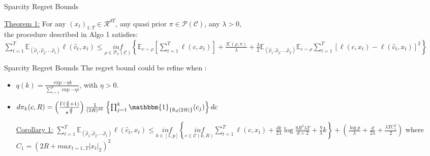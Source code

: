 \documentclass[10pt]{beamer}
\begin{document}
\begin{frame}{Sparcity Regret Bounds}
\begin{block}{\underline{Theorem 1:}}
For any $(x_{t})_{1:T} \in \mathscr{R}^{dT}$,
any quasi prior $\pi \in \mathscr{P}(\mathscr{C})$, any $\lambda >0$,\\
\smallbreak 
the procedure described in Algo 1 satisfies:\\
\smallbreak
$
\sum_{t=1}^{T} \mathds{E}_{(\hat{\rho}_{1},\hat{\rho}_{2},...\hat{\rho}_{t})}
\ell(\hat{c}_{t}, x_{t}) \leq  \underset{\rho \in \mathscr{P}_{\pi}(\mathscr{C})}{inf}  \left\{ \mathds{E}_{c \sim \rho} [ \sum_{t=1}^{T} \ell (c, x_{t}) ] +
\frac{\mathcal{K}(\rho, \pi)}{\lambda} + 
\frac{\lambda}{2} \mathds{E}_{(\hat{\rho}_{1},\hat{\rho}_{2},...\hat{\rho}_{T})} \mathds{E}_{c \sim \rho} \sum_{t=1}^{T} [\ell (c, x_{t}) - \ell (\hat{c}_{t}, x_{t})]^{2} \right\}
$
\end{block}
\end{frame}

\begin{frame}[fragile]{Sparcity Regret Bounds}
The regret bound could be refine when :\\
\begin{itemize}
\item $q(k) = \frac{\exp{-\eta k}}{\sum_{i=1}^{p}\exp{-\eta i}}$, with $\eta >0$.\\
\item $d\pi_{k}(c, R) = \left(\frac{\Gamma (\frac{d}{2}+1)}{\pi^{\frac{d}{2}}} \right) \frac{1}{(2R)^{dk}} \left\{ \prod_{j=1}^{k} \mathbbm{1}_{\{ \mathbb{B}_{d}(2R) \} }(c_{j}) \right\} dc$
\smallbreak
\begin{block}{\underline{Corollary 1:}}
$\sum_{t=1}^{T} \mathds{E}_{(\hat{\rho}_{1},\hat{\rho}_{2},...\hat{\rho}_{t})}             \ell (\hat{c}_{t}, x_{t}) \leq                                     \underset{k \in [1,p]}{inf} \left\{                                       \underset{c \in \mathscr{C}(k,R)}{inf} \sum_{t=1}^{T}  \ell (c, x_{t})   +\frac{dk}{2\lambda}\log{\frac{8R^{2}\lambda T}{d=2}}+\frac{\eta}{\lambda}k \right\}
+ \left( \frac{\log{p}}{\lambda} +\frac{d}{2\lambda} +\frac{\lambda T C_{1}^{2}}{2} \right)$
\smallbreak
where $C_{1}=(2R+max_{t=1..T}|x_{t}|_{2})^{2} $
\end{block}
\end{itemize}
\end{frame}
\end{document}
